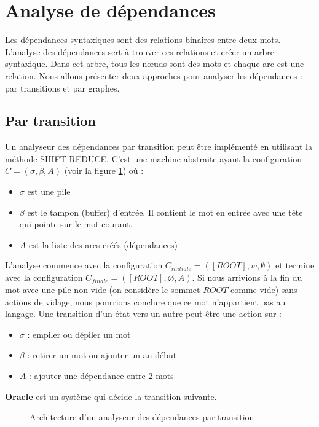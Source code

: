 \documentclass{KodeBook}
\begin{document}
\section{Analyse de dépendances}

Les dépendances syntaxiques sont des relations binaires entre deux mots. 
L'analyse des dépendances sert à trouver ces relations et créer un arbre syntaxique. 
Dans cet arbre, tous les nœuds sont des mots et chaque arc est une relation.
Nous allons présenter deux approches pour analyser les dépendances : par transitions et par graphes.

\subsection{Par transition}

Un analyseur des dépendances par transition peut être implémenté en utilisant la méthode SHIFT-REDUCE. 
C'est une machine abstraite ayant la configuration $C = (\sigma, \beta, A)$ (voir la figure \ref{fig:dep-trans-arch}) où :
\begin{itemize}
	\item $\sigma$ est une pile
	\item $\beta$ est le tampon (buffer) d'entrée. 
	Il contient le mot en entrée avec une tête qui pointe sur le mot courant.
	\item $A$ est la liste des arcs créés (dépendances)
\end{itemize}
L'analyse commence avec la configuration $C_{initiale} = ([ROOT], w, \emptyset)$ et termine avec la configuration $C_{finale} = ([ROOT], \varnothing, A)$.
Si nous arrivions à la fin du mot avec une pile non vide (on considère le sommet $ROOT$ comme vide) sans actions de vidage, nous pourrions conclure que ce mot n'appartient pas au langage. 
Une transition d'un état vers un autre peut être une action sur :
\begin{itemize}
	\item $\sigma$ : empiler ou dépiler un mot
	\item $\beta$ : retirer un mot ou ajouter un au début
	\item $A$ : ajouter une dépendance entre 2 mots
\end{itemize}
\textbf{Oracle} est un système qui décide la transition suivante.

\begin{figure}[ht]
	\centering
	\caption{Architecture d'un analyseur des dépendances par transition \label{fig:dep-trans-arch}}
\end{figure}
\end{document}
